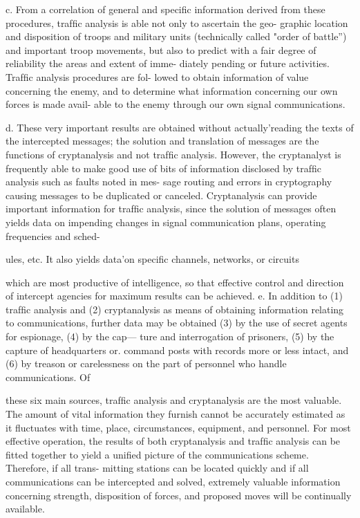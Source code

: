 c. From a correlation of general and speciﬁc information derived from
these procedures, trafﬁc analysis is able not only to ascertain the geo-
graphic location and disposition of troops and military units (technically
called "order of battle”) and important troop movements, but also to
predict with a fair degree of reliability the areas and extent of imme-
diately pending or future activities. Trafﬁc analysis procedures are fol-
lowed to obtain information of value concerning the enemy, and to
determine what information concerning our own forces is made avail-
able to the enemy through our own signal communications.

d. These very important results are obtained without actually'reading
the texts of the intercepted messages; the solution and translation of
messages are the functions of cryptanalysis and not trafﬁc analysis.
However, the cryptanalyst is frequently able to make good use of bits
of information disclosed by trafﬁc analysis such as faults noted in mes-
sage routing and errors in cryptography causing messages to be duplicated
or canceled. Cryptanalysis can provide important information for trafﬁc
analysis, since the solution of messages often yields data on impending
changes in signal communication plans, operating frequencies and sched-

ules, etc. It also yields data'on speciﬁc channels, networks, or circuits

which are most productive of intelligence, so that effective control and
direction of intercept agencies for maximum results can be achieved.
e. In addition to (1) trafﬁc analysis and (2) cryptanalysis as means of
obtaining information relating to communications, further data may be
obtained (3) by the use of secret agents for espionage, (4) by the cap—
ture and interrogation of prisoners, (5) by the capture of headquarters
or. command posts with records more or less intact, and (6) by treason
or carelessness on the part of personnel who handle communications. Of

these six main sources, trafﬁc analysis and cryptanalysis are the most
valuable. The amount of vital information they furnish cannot be
accurately estimated as it ﬂuctuates with time, place, circumstances,
equipment, and personnel. For most effective operation, the results of
both cryptanalysis and trafﬁc analysis can be ﬁtted together to yield a
uniﬁed picture of the communications scheme. Therefore, if all trans-
mitting stations can be located quickly and if all communications can be
intercepted and solved, extremely valuable information concerning
strength, disposition of forces, and proposed moves will be continually
available.

